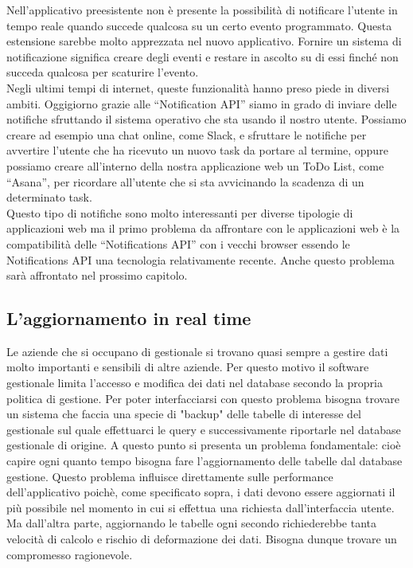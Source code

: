 Nell'applicativo preesistente non è presente  la possibilità di notificare l'utente in tempo reale quando succede qualcosa su un certo evento programmato.  Questa estensione sarebbe molto apprezzata nel nuovo applicativo. Fornire un sistema di notificazione significa creare degli eventi e restare in ascolto su di essi finché non succeda qualcosa per scaturire l'evento. \\

Negli ultimi tempi di internet, queste funzionalità hanno preso piede in diversi ambiti. Oggigiorno grazie alle “Notification API” siamo in grado di inviare delle notifiche sfruttando il sistema operativo che sta usando il nostro utente. Possiamo creare ad esempio una chat online, come Slack, e sfruttare le notifiche per avvertire l'utente che ha ricevuto un nuovo task da portare al termine, oppure possiamo creare all'interno della nostra applicazione web un ToDo List, come “Asana”, per ricordare all'utente che si sta avvicinando la scadenza di un determinato task.\\
Questo tipo di notifiche sono molto interessanti per diverse tipologie di applicazioni web ma il primo problema da affrontare con le applicazioni web è la compatibilità delle “Notifications API”  con i vecchi  browser essendo le Notifications API una tecnologia relativamente recente. Anche questo problema sarà affrontato nel prossimo capitolo.


\subsection{L'aggiornamento in real time}
Le aziende che si occupano di gestionale si trovano quasi sempre a gestire dati molto importanti e sensibili di altre aziende. Per questo motivo il software gestionale limita l'accesso e modifica dei dati nel database secondo la propria politica di gestione. Per poter interfacciarsi con questo problema bisogna trovare un sistema che faccia una specie di "backup" delle tabelle di interesse del gestionale sul quale effettuarci le query e successivamente riportarle nel database gestionale di origine. A questo punto si presenta un problema fondamentale: cioè capire ogni quanto tempo bisogna fare l'aggiornamento delle tabelle dal database gestione. Questo problema influisce direttamente sulle performance dell'applicativo poichè, come specificato sopra, i dati devono essere aggiornati il più possibile nel momento in cui si effettua una richiesta dall'interfaccia utente. Ma dall'altra parte, aggiornando le tabelle ogni secondo richiederebbe tanta velocità di calcolo e rischio di deformazione dei dati. Bisogna dunque trovare un compromesso ragionevole. 

